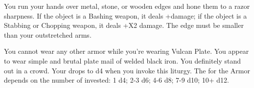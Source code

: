{You run your hands over \DICE metal, stone, or wooden edges and hone them to a razor sharpness. If the object is a Bashing weapon, it deals +\DICE damage; if the object is a Stabbing or Chopping weapon, it deals +\DICE X2 damage. The edge must be smaller than your outstretched arms.

\LITURGY [
  Name= Vulcan Plate,
  Link=vulcan-liturgy-plate,
  Paradigm= Force ,
  Save=  N ,
  Duration= Session ,
  Counter=  n/a  ,
  Keywords= None ,
  Target=   Self
]



You cannot wear any other armor while you're wearing Vulcan Plate.  You appear to wear simple and brutal plate mail of welded black iron.  You definitely stand out in a crowd.  Your \MD drops to d4 when you invoke this liturgy.  The \UD for the Armor depends on the number of \DICE invested: 1 d4; 2-3 d6; 4-6 d8; 7-9 d10; 10+ d12.




}%